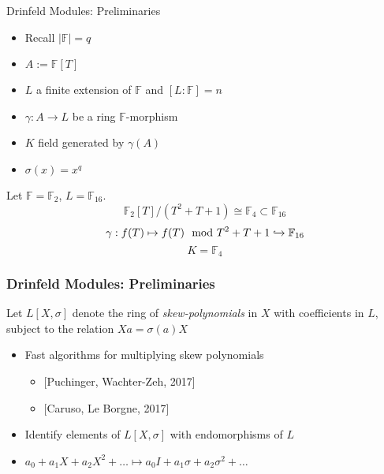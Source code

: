 \documentclass{beamer}
\newcommand{\f}{\mathbb{F}}
\begin{document}
\begin{frame}{Drinfeld Modules: Preliminaries}
    \begin{itemize}
        \item Recall $|\mathbb{F}| = q$
        \item $A:= \f[T]$
        \item $L$ a finite extension of $\mathbb{F}$ and $[L: \f] = n$

        \item $\gamma: A \to L $ be a ring $\mathbb{F}$-morphism
        \item $K$ field generated by $\gamma(A)$
        \item $\sigma(x) = x^q$

    \end{itemize}
    
    \begin{example}
    Let $\f = \f_2$, $L = \mathbb{F}_{16}$.
    \[ \f_2[T]/(T^2 + T + 1) \cong \f_4 \subset \f_{16}\]
    \[ \gamma : f(T) \mapsto f(T) \mod T^2 + T + 1 \xhookrightarrow{} \f_{16} \]
    \[K = \f_4\]
    \end{example}
\end{frame}






\begin{frame}
\frametitle{Drinfeld Modules: Preliminaries}
\begin{definition}
Let $L[X,\sigma]$ denote the ring of \textit{skew-polynomials} in $X$ with coefficients in $L$, subject to the relation $Xa = \sigma(a)X$
\end{definition}

\begin{itemize}
    \item Fast algorithms for multiplying skew polynomials
    \begin{itemize}
        \item $[$Puchinger, Wachter-Zeh, 2017]
        \item $[$Caruso, Le Borgne, 2017]
    \end{itemize}
    \item Identify elements of $L[X,\sigma]$ with endomorphisms of $L$
     \item  $a_0 + a_1X + a_2X^2 + \ldots \mapsto a_0I + a_1 \sigma + a_2 \sigma^2 + \ldots$
\end{itemize}

\end{frame}
\end{document}
